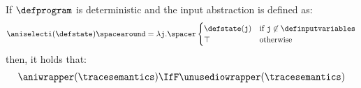 \begin{proposition}
  If $\defprogram$ is deterministic and the input abstraction is defined as:
  \begin{align*}
    \aniselecti(\defstate) \spacearound= \lambda \texttt{j}. \spacer
    \begin{cases}
      \defstate(\texttt{j}) & \text{if } \texttt{j} \not\in \definputvariables \\
      \top & \text{otherwise}
    \end{cases}
  \end{align*}
  then, it holds that:
  \begin{align*}
    \aniwrapper(\tracesemantics) \IfF \unusediowrapper(\tracesemantics)
  \end{align*}
\end{proposition}
